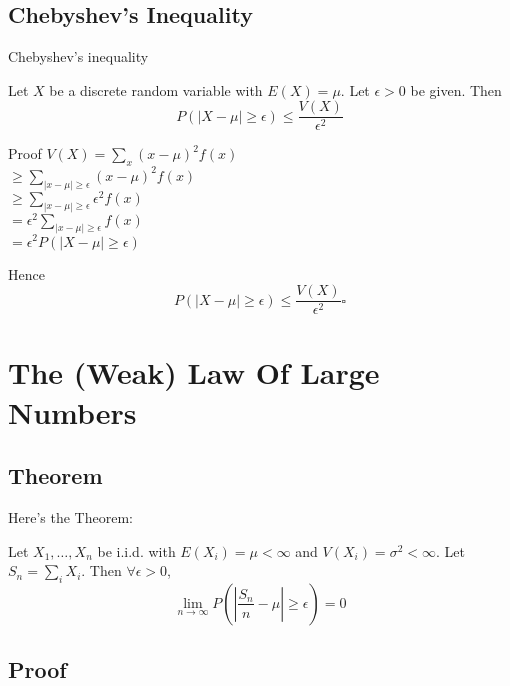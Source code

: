 \documentclass[9pt]{beamer}
\begin{document}
\subsection{Chebyshev's Inequality}


\begin{frame}{Chebyshev's inequality}

Let $X$ be a discrete random variable with $E(X) = \mu$. Let $\epsilon>0$ be given. Then 
\[ P\left( \left| X-\mu \right| \geq \epsilon \right) \leq \frac{V(X)}{\epsilon^{2}}\]

\end{frame}

\begin{frame}{Proof}
\pause
$V(X)=\sum_{x}\left( x-\mu \right)^{2}f(x)$ \pause \\ 
$\geq \sum_{\left| x - \mu \right|\geq \epsilon}\left( x-\mu \right)^{2}f(x) $ \pause \\
$\geq \sum_{\left| x - \mu \right|\geq \epsilon}\epsilon^{2}f(x)$ \pause \\
$= \epsilon^{2}\sum_{\left| x - \mu \right|\geq \epsilon}f(x)$ \pause \\
$= \epsilon^{2}P\left( \left| X-\mu \right|\geq \epsilon \right)$ \pause

Hence \[ P\left( \left| X-\mu \right| \geq \epsilon \right) \leq \frac{V(X)}{\epsilon^{2}} \square\]
\end{frame}

\section{The (Weak) Law Of Large Numbers}
\subsection{Theorem}

\begin{frame}{Here's the Theorem:}

Let $X_{1},\ldots,X_{n}$ be i.i.d. with $E(X_{i})=\mu <\infty$ and $V(X_{i})=\sigma^{2}<\infty$. Let $S_{n}=\sum_{i}X_{i}$. Then $\forall \epsilon>0$, 
\[ \lim_{n\rightarrow \infty }P\left( \left| \frac{S_{n}}{n}-\mu \right|\geq \epsilon \right) =0 \]

\end{frame}

\subsection{Proof}
\end{document}
